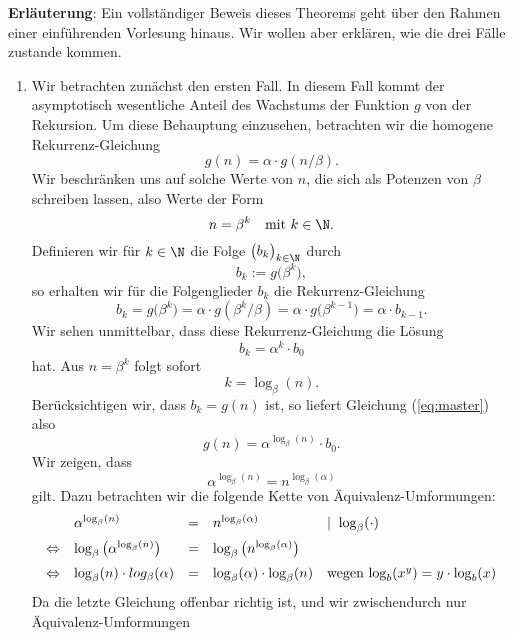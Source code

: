 \textbf{Erl\"auterung}:
Ein vollst\"andiger Beweis dieses Theorems geht \"uber den Rahmen einer einf\"uhrenden Vorlesung hinaus.
Wir wollen aber erkl\"aren, wie die drei F\"alle zustande kommen.
\begin{enumerate}
\item Wir betrachten zun\"achst den ersten Fall.  In diesem Fall kommt der asymptotisch 
wesentliche Anteil des Wachstums der Funktion $g$ von der Rekursion. 
Um diese Behauptung einzusehen, betrachten wir die homogene Rekurrenz-Gleichung
\[ g(n) = \alpha \cdot g\left(n/\beta\right). \]
Wir beschr\"anken uns auf solche Werte von $n$, die sich als Potenzen von $\beta$ schreiben
lassen, also Werte der Form 
\[ n = \beta^k \quad \mbox{mit $k\in\N$.} \]
Definieren wir f\"ur $k \in \N$ die Folge $\bigl(b_k\bigr)_{k\in\N}$ durch
\[ b_k := g\bigl(\beta^k\bigr), \]
so erhalten wir f\"ur die Folgenglieder $b_k$ die Rekurrenz-Gleichung 
\[
     b_k = g\bigl(\beta^k\bigr) = \alpha \cdot g\left( \beta^k/\beta \right) 
   = \alpha \cdot g\bigl(\beta^{k-1}\bigr) = \alpha \cdot b_{k-1}.
\]
Wir sehen unmittelbar, dass diese Rekurrenz-Gleichung die L\"osung 
\begin{equation}
  \label{eq:master}
  b_k = \alpha^k \cdot b_0   
\end{equation}
hat.  Aus $n = \beta^k$ folgt sofort 
\[  k = \log_\beta(n). \]
Ber\"ucksichtigen wir, dass $b_k = g(n)$ ist, so liefert Gleichung (\ref{eq:master}) also 
\begin{equation}
  \label{eq:master2}
   g(n) = \alpha^{\log_\beta(n)} \cdot b_0.   
\end{equation}
Wir zeigen, dass
\begin{equation}
  \label{eq:master1}
  \alpha^{\log_\beta(n)} = n^{\log_\beta(\alpha)} 
\end{equation}
gilt.  Dazu betrachten wir die folgende Kette von Äquivalenz-Umformungen:
\[ 
\begin{array}[t]{llcll}
                & \alpha^{\log_\beta(n)} & = & n^{\log_\beta(\alpha)} & \mid\; \log_\beta(\cdot)  \\[0.2cm]
\Leftrightarrow & \log_\beta\left(\alpha^{\log_\beta(n)}\right) 
                  & = & \log_\beta\left(n^{\log_\beta(\alpha)}\right) \\[0.2cm]
\Leftrightarrow & \log_\beta(n) \cdot log_\beta(\alpha) 
                  & = & \log_\beta(\alpha) \cdot \log_\beta(n) & 
                  \mbox{wegen $\log_b(x^y) = y \cdot \log_b(x)$}
\end{array}
\]
Da die letzte Gleichung offenbar richtig ist, und wir zwischendurch nur Äquivalenz-Umformungen

\end{enumerate}
